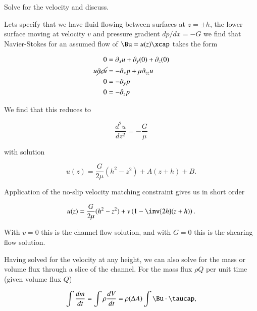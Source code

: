 \begin{Exercise}[
title={Rectilinear flow problem with a pressure gradient and shearing surface},
label={problem:fluids:review:q1}
]
Solve for the velocity and discuss.
\end{Exercise}

\begin{Answer}[ref={problem:fluids:review:q1}]
Lets specify that we have fluid flowing between surfaces at $z = \pm h$, the lower surface moving at velocity $v$ and pressure gradient $dp/dx = -G$ we find that Navier-Stokes for an assumed flow of $\Bu = u(z) \xcap$ takes the form

\begin{align}\label{eqn:continuumFluidsReview:1270}
0 &= \partial_x u + \partial_y (0) + \partial_z (0) \\
u \cancel{\partial_x u} &= - \partial_x p + \mu \partial_{zz} u \\
0 &= -\partial_y p \\
0 &= -\partial_z p
\end{align}

We find that this reduces to 

\begin{equation}\label{eqn:continuumFluidsReview:1290}
\frac{d^2 u}{dz^2} = -\frac{G}{\mu}
\end{equation}

with solution

\begin{equation}\label{eqn:continuumFluidsReview:1310}
u(z) = \frac{G}{2\mu}(h^2 - z^2) + A (z + h) + B.
\end{equation}

Application of the no-slip velocity matching constraint gives us in short order

\begin{equation}\label{eqn:continuumFluidsReview:1330}
u(z) = \frac{G}{2\mu}(h^2 - z^2) + v \left( 1 - \inv{2h} (z + h) \right).
\end{equation}

With $v = 0$ this is the channel flow solution, and with $G = 0$ this is the shearing flow solution.

Having solved for the velocity at any height, we can also solve for the mass or volume flux through a slice of the channel.  For the mass flux $\rho Q$ per unit time (given volume flux $Q$)

\begin{equation}\label{eqn:continuumFluidsReview:1350}
\int \frac{dm}{dt} 
=
\int \rho \frac{dV}{dt} 
=
\rho (\Delta A) \int \Bu \cdot \taucap,
\end{equation}


\end{Answer}
